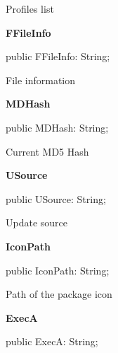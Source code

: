 \documentclass{report}
\newif\ifpdf
\begin{document}
\begin{list}{}
\begin{flushleft}
\ifpdf
\end{flushleft}
\fi


\par Profiles list\label{igobase.TIWizFrm-FFileInfo}
\item[\textbf{FFileInfo}\hfill]
\ifpdf
\begin{flushleft}
\fi
\begin{ttfamily}
public FFileInfo: String;\end{ttfamily}

\ifpdf
\end{flushleft}
\fi


\par File information\label{igobase.TIWizFrm-MDHash}
\item[\textbf{MDHash}\hfill]
\ifpdf
\begin{flushleft}
\fi
\begin{ttfamily}
public MDHash: String;\end{ttfamily}

\ifpdf
\end{flushleft}
\fi


\par Current MD5 Hash\label{igobase.TIWizFrm-USource}
\item[\textbf{USource}\hfill]
\ifpdf
\begin{flushleft}
\fi
\begin{ttfamily}
public USource: String;\end{ttfamily}

\ifpdf
\end{flushleft}
\fi


\par Update source\label{igobase.TIWizFrm-IconPath}
\item[\textbf{IconPath}\hfill]
\ifpdf
\begin{flushleft}
\fi
\begin{ttfamily}
public IconPath: String;\end{ttfamily}

\ifpdf
\end{flushleft}
\fi


\par Path of the package icon\label{igobase.TIWizFrm-ExecA}
\item[\textbf{ExecA}\hfill]
\ifpdf
\begin{flushleft}
\fi
\begin{ttfamily}
public ExecA: String;\end{ttfamily}


\end{flushleft}
\end{list}
\end{document}
